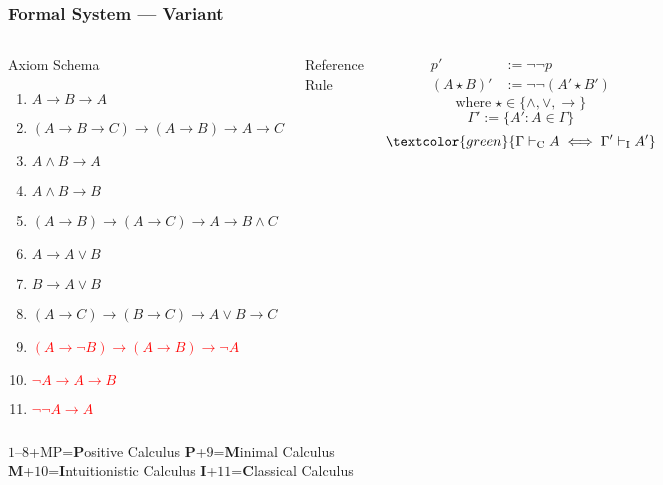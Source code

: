 \documentclass[UTF8,aspectratio=43,11pt,colorlinks,compress,openany]{beamer}%
\begin{document}
\begin{frame}\frametitle{Formal System --- Variant}\vspace*{-5pt}
	\begin{columns}
			\begin{block}{Axiom Schema}
				\begin{enumerate}
					\item $A\to B\to A$
					\item $(A\to B\to C)\to(A\to B)\to A\to C$
					\item $A\wedge B\to A$
					\item $A\wedge B\to B$
					\item $(A\to B)\to(A\to C)\to A\to B\wedge C$
					\item $A\to A\vee B$
					\item $B\to A\vee B$
					\item $(A\to C)\to(B\to C)\to A\vee B\to C$
					\item \textcolor{red}{$(A\to\neg B)\to(A\to B)\to\neg A$}
					\item \textcolor{red}{$\neg A\to A\to B$}
					\item \textcolor{red}{$\neg\neg A\to A$}
				\end{enumerate}
			\end{block}
			\begin{block}{Reference Rule}
				\begin{prooftree}
					\alwaysSingleLine
					\RightLabel{\textcolor{yellow}{[MP]}}
				\end{prooftree}
			\end{block}
			\vbox{
				\begin{align*}
				p'&:=\neg\neg p\\
				(A\star B)'&:=\neg\neg(A'\star B')
				\end{align*}\vspace{-21pt}
				\[\text{where}\;\star\in\{\wedge,\vee,\to\}\]
				\[\Gamma':=\{A': A\in\Gamma\}\]
				\[\textcolor{green}{\Gamma\vdash_{\mathrm{C}} A\iff\Gamma'\vdash_{\mathrm{I}} A'}\]
			}
	\end{columns}
	\vspace{5pt}\centering
	$1$--$8$+MP=\textbf{P}ositive Calculus \quad \textbf{P}+$9$=\textbf{M}inimal Calculus\\
	\textbf{M}+$10$=\textbf{I}ntuitionistic Calculus \quad \textbf{I}+$11$=\textbf{C}lassical Calculus
\end{frame}
\end{document}
